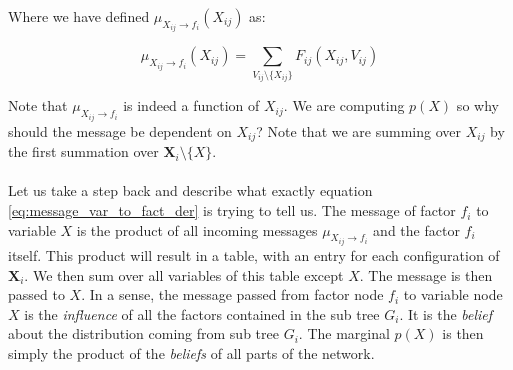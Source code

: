 \noindent
Where we have defined $\mu_{X_{ij} \rightarrow f_i}(X_{ij})$ as:

\begin{equation}\label{eq:message_var_to_fact}
\mu_{X_{ij} \rightarrow f_i}(X_{ij}) = \sum_{V_{ij} \setminus \{X_{ij}\}}
			F_{ij}(X_{ij}, V_{ij})
\end{equation}

\noindent
Note that $\mu_{X_{ij} \rightarrow f_i}$ is indeed a function of
$X_{ij}$. We are computing $p(X)$ so why should the message be 
dependent on $X_{ij}$? Note that we are summing over $X_{ij}$ by 
the first summation over $\textbf{X}_i \setminus \{X\}$. 
\\\\
Let us
take a step back and describe what exactly equation 
\ref{eq:message_var_to_fact_der} is trying to tell us. The message
of factor $f_i$ to variable $X$ is the product of all incoming
messages $\mu_{X_{ij} \rightarrow f_i}$ and the factor $f_i$ itself.
This product will result in a table, with an entry for each configuration
of $\textbf{X}_i$. We then sum over all variables of this table
except $X$. The message is then passed to $X$. In a sense, the message
passed from factor node $f_i$ to variable node $X$ is the \textit{influence}
of all the factors contained in the sub tree $G_i$. It is the \textit{belief}
about the distribution coming from sub tree $G_i$. The marginal
$p(X)$ is then simply the product of the \textit{beliefs}
of all parts of the network.

